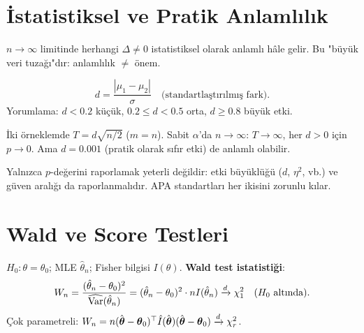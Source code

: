 \section{İstatistiksel ve Pratik Anlamlılık}
\label{sec:etki_buyuklugu}

\begin{kesif}
$n\to\infty$ limitinde herhangi $\Delta\neq0$ istatistiksel olarak anlamlı hâle gelir. Bu "büyük veri tuzağı"dır: anlamlılık $\neq$ önem.
\end{kesif}

\begin{tanim}\label{def:etki_buyuklugu}
\[
  d = \frac{|\mu_1-\mu_2|}{\sigma} \quad \text{(standartlaştırılmış fark)}.
\]
Yorumlama: $d<0.2$ küçük, $0.2\leq d<0.5$ orta, $d\geq0.8$ büyük etki.
\end{tanim}

\begin{teorem}\label{thm:t_d}
İki örneklemde $T=d\sqrt{n/2}$ ($m=n$). Sabit $\alpha$'da $n\to\infty$: $T\to\infty$, her $d>0$ için $p\to0$. Ama $d=0.001$ (pratik olarak sıfır etki) de anlamlı olabilir.
\end{teorem}

\begin{hataanalizi}
Yalnızca $p$-değerini raporlamak yeterli değildir: etki büyüklüğü ($d$, $\eta^2$, vb.) ve güven aralığı da raporlanmalıdır. APA standartları her ikisini zorunlu kılar.
\end{hataanalizi}

\section{Wald ve Score Testleri}
\label{sec:wald_score}

\begin{tanim}\label{def:wald_testi}
$H_0:\theta=\theta_0$; MLE $\hat\theta_n$; Fisher bilgisi $I(\theta)$. \textbf{Wald test istatistiği}:
\[
  W_n = \frac{(\hat\theta_n-\theta_0)^2}{\widehat{\operatorname{Var}}(\hat\theta_n)} = (\hat\theta_n-\theta_0)^2 \cdot nI(\hat\theta_n) \xrightarrow{d} \chi^2_1 \quad (H_0 \text{ altında}).
\]
Çok parametreli: $W_n = n(\hat{\boldsymbol\theta}-\boldsymbol\theta_0)^\top \hat{I}(\hat{\boldsymbol\theta})(\hat{\boldsymbol\theta}-\boldsymbol\theta_0)\xrightarrow{d}\chi^2_r$.
\end{tanim}

